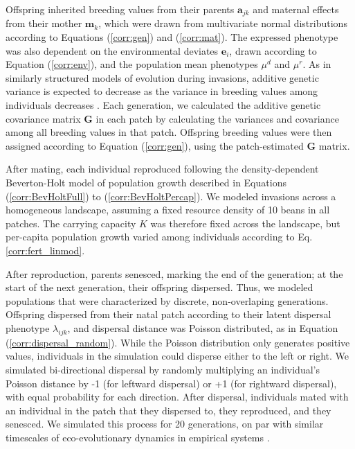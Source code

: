 \documentclass[11pt]{article}
\begin{document}
Offspring inherited breeding values from their parents $\bm{a}_{jk}$ and maternal effects from their mother $\bm{m}_{k}$, which were drawn from multivariate normal distributions according to Equations (\ref{corr:gen}) and (\ref{corr:mat}).
The expressed phenotype was also dependent on the environmental deviates $\bm{e}_{i}$, drawn according to Equation (\ref{corr:env}), and the population mean phenotypes $\mu^{d}$ and $\mu^{r}$.
As in similarly structured models of evolution during invasions, additive genetic variance is expected to decrease as the variance in breeding values among individuals decreases \citep{phillips_evolutionary_2015}.
Each generation, we calculated the additive genetic covariance matrix $\bm{G}$ in each patch by calculating the variances and covariance among all breeding values in that patch.
Offspring breeding values were then assigned according to Equation (\ref{corr:gen}), using the patch-estimated $\bm{G}$ matrix.

After mating, each individual reproduced following the density-dependent Beverton-Holt model of population growth described in Equations (\ref{corr:BevHoltFull}) to (\ref{corr:BevHoltPercap}).
We modeled invasions across a homogeneous landscape, assuming a fixed resource density of 10 beans in all patches. The carrying capacity $K$ was therefore fixed across the landscape, but per-capita population growth varied among individuals according to Eq. \ref{corr:fert_linmod}.

After reproduction, parents senesced, marking the end of the generation; at the start of the next generation, their offspring dispersed.
Thus, we modeled populations that were characterized by discrete, non-overlaping generations.
Offspring dispersed from their natal patch according to their latent dispersal phenotype $\lambda_{ijk}$, and dispersal distance was Poisson distributed, as in Equation (\ref{corr:dispersal_random}).
While the Poisson distribution only generates positive values, individuals in the simulation could disperse either to the left or right. We simulated bi-directional dispersal by randomly multiplying an individual's Poisson distance by -1 (for leftward dispersal) or +1 (for rightward dispersal), with equal probability for each direction.
After dispersal, individuals mated with an individual in the patch that they dispersed to, they reproduced, and they senesced.
We simulated this process for 20 generations, on par with similar timescales of eco-evolutionary dynamics in empirical systems \citep{williams_rapid_2016,ochocki_rapid_2017,weiss-lehman_rapid_2017}.
\end{document}
